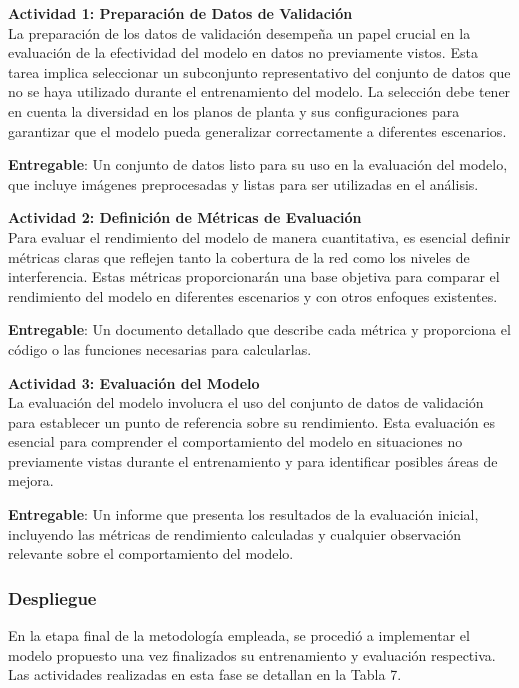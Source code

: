 \textbf{Actividad 1: Preparación de Datos de Validación}
\\
La preparación de los datos de validación desempeña un papel crucial en la evaluación de la efectividad del modelo en datos no previamente vistos. Esta tarea implica seleccionar un subconjunto representativo del conjunto de datos que no se haya utilizado durante el entrenamiento del modelo. La selección debe tener en cuenta la diversidad en los planos de planta y sus configuraciones para garantizar que el modelo pueda generalizar correctamente a diferentes escenarios.

\textbf{Entregable}: Un conjunto de datos listo para su uso en la evaluación del modelo, que incluye imágenes preprocesadas y listas para ser utilizadas en el análisis.

\textbf{Actividad 2: Definición de Métricas de Evaluación}
\\
Para evaluar el rendimiento del modelo de manera cuantitativa, es esencial definir métricas claras que reflejen tanto la cobertura de la red como los niveles de interferencia. Estas métricas proporcionarán una base objetiva para comparar el rendimiento del modelo en diferentes escenarios y con otros enfoques existentes.

\textbf{Entregable}: Un documento detallado que describe cada métrica y proporciona el código o las funciones necesarias para calcularlas.

\vspace{0.5cm}
\textbf{Actividad 3: Evaluación del Modelo}
\\
La evaluación del modelo involucra el uso del conjunto de datos de validación para establecer un punto de referencia sobre su rendimiento. Esta evaluación es esencial para comprender el comportamiento del modelo en situaciones no previamente vistas durante el entrenamiento y para identificar posibles áreas de mejora.

\textbf{Entregable}: Un informe que presenta los resultados de la evaluación inicial, incluyendo las métricas de rendimiento calculadas y cualquier observación relevante sobre el comportamiento del modelo.

\subsubsection{Despliegue}
En la etapa final de la metodología empleada, se procedió a implementar el modelo propuesto una vez finalizados su entrenamiento y evaluación respectiva. Las actividades realizadas en esta fase se detallan en la Tabla 7.

